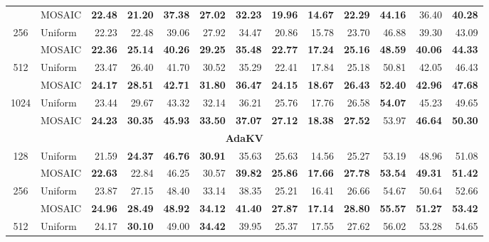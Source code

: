 \begin{table}[tp]
\begin{tabular}{@{} c l rrrr rrrr rrr @{}}
     & MOSAIC & \textbf{22.48} & \textbf{21.20} & \textbf{37.38} & \textbf{27.02} & \textbf{32.23} & \textbf{19.96} & \textbf{14.67} & \textbf{22.29} & \textbf{44.16} & 36.40 & \textbf{40.28} \\
    \cmidrule(l){1-13}
    \multirow{2}{*}{256} & Uniform & 22.23 & 22.48 & 39.06 & 27.92 & 34.47 & 20.86 & 15.78 & 23.70 & 46.88 & 39.30 & 43.09 \\
     & MOSAIC & \textbf{22.36} & \textbf{25.14} & \textbf{40.26} & \textbf{29.25} & \textbf{35.48} & \textbf{22.77} & \textbf{17.24} & \textbf{25.16} & \textbf{48.59} & \textbf{40.06} & \textbf{44.33} \\
    \cmidrule(l){1-13}
    \multirow{2}{*}{512} & Uniform & 23.47 & 26.40 & 41.70 & 30.52 & 35.29 & 22.41 & 17.84 & 25.18 & 50.81 & 42.05 & 46.43 \\
     & MOSAIC & \textbf{24.17} & \textbf{28.51} & \textbf{42.71} & \textbf{31.80} & \textbf{36.47} & \textbf{24.15} & \textbf{18.67} & \textbf{26.43} & \textbf{52.40} & \textbf{42.96} & \textbf{47.68} \\
    \cmidrule(l){1-13}
    \multirow{2}{*}{1024} & Uniform & 23.44 & 29.67 & 43.32 & 32.14 & 36.21 & 25.76 & 17.76 & 26.58 & \textbf{54.07} & 45.23 & 49.65 \\
     & MOSAIC & \textbf{24.23} & \textbf{30.35} & \textbf{45.93} & \textbf{33.50} & \textbf{37.07} & \textbf{27.12} & \textbf{18.38} & \textbf{27.52} & 53.97 & \textbf{46.64} & \textbf{50.30} \\
    \midrule
    \multicolumn{13}{c}{\textbf{AdaKV}} \\
    \midrule
    \multirow{2}{*}{128} & Uniform & 21.59 & \textbf{24.37} & \textbf{46.76} & \textbf{30.91} & 35.63 & 25.63 & 14.56 & 25.27 & 53.19 & 48.96 & 51.08 \\
     & MOSAIC & \textbf{22.63} & 22.84 & 46.25 & 30.57 & \textbf{39.82} & \textbf{25.86} & \textbf{17.66} & \textbf{27.78} & \textbf{53.54} & \textbf{49.31} & \textbf{51.42} \\
    \cmidrule(l){1-13}
    \multirow{2}{*}{256} & Uniform & 23.87 & 27.15 & 48.40 & 33.14 & 38.35 & 25.21 & 16.41 & 26.66 & 54.67 & 50.64 & 52.66 \\
     & MOSAIC & \textbf{24.96} & \textbf{28.49} & \textbf{48.92} & \textbf{34.12} & \textbf{41.40} & \textbf{27.87} & \textbf{17.14} & \textbf{28.80} & \textbf{55.57} & \textbf{51.27} & \textbf{53.42} \\
    \cmidrule(l){1-13}
    \multirow{2}{*}{512} & Uniform & 24.17 & \textbf{30.10} & 49.00 & \textbf{34.42} & 39.95 & 25.37 & 17.55 & 27.62 & 56.02 & 53.28 & 54.65 \\

\end{tabular}
\end{table}
